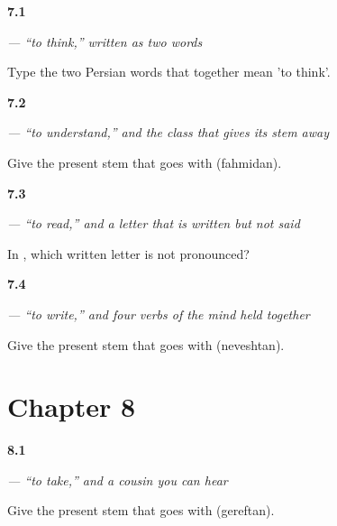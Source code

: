 \noindent\begin{minipage}[t]{\linewidth}
\raggedright
\hypertarget{review-FA-C07-fekr-kardan-verb}{\textbf{7.1}} \emph{  — “to think,” written as two words}\par
\small Type the two Persian words that together mean 'to think'.
\end{minipage}\par\medskip

\noindent\begin{minipage}[t]{\linewidth}
\raggedright
\hypertarget{review-FA-C07-fahmidan-stem}{\textbf{7.2}} \emph{ — “to understand,” and the class that gives its stem away}\par
\small Give the present stem that goes with  (fahmidan).
\end{minipage}\par\medskip

\noindent\begin{minipage}[t]{\linewidth}
\raggedright
\hypertarget{review-FA-C07-khandan-silent-vav}{\textbf{7.3}} \emph{ — “to read,” and a letter that is written but not said}\par
\small In , which written letter is not pronounced?
\end{minipage}\par\medskip

\noindent\begin{minipage}[t]{\linewidth}
\raggedright
\hypertarget{review-FA-C07-neveshtan-stem}{\textbf{7.4}} \emph{ — “to write,” and four verbs of the mind held together}\par
\small Give the present stem that goes with  (neveshtan).
\end{minipage}\par\medskip

\section*{Chapter 8}

\noindent\begin{minipage}[t]{\linewidth}
\raggedright
\hypertarget{review-FA-C08-gereftan-stem}{\textbf{8.1}} \emph{ — “to take,” and a cousin you can hear}\par
\small Give the present stem that goes with  (gereftan).
\end{minipage}\par\medskip


